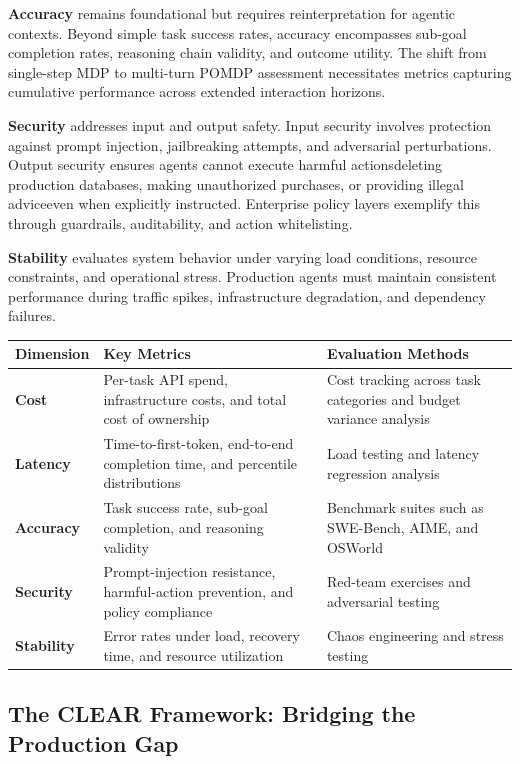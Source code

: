 \textbf{Accuracy} remains foundational but requires reinterpretation for agentic contexts. Beyond simple task success rates, accuracy encompasses sub-goal completion rates, reasoning chain validity, and outcome utility. The shift from single-step MDP to multi-turn POMDP assessment necessitates metrics capturing cumulative performance across extended interaction horizons.

\textbf{Security} addresses input and output safety. Input security involves protection against prompt injection, jailbreaking attempts, and adversarial perturbations. Output security ensures agents cannot execute harmful actionsdeleting production databases, making unauthorized purchases, or providing illegal adviceeven when explicitly instructed. Enterprise policy layers exemplify this through guardrails, auditability, and action whitelisting.

\textbf{Stability} evaluates system behavior under varying load conditions, resource constraints, and operational stress. Production agents must maintain consistent performance during traffic spikes, infrastructure degradation, and dependency failures.

\begin{table}[tbp]
\centering
\footnotesize
\begin{tabularx}{\textwidth}{YYY}
\toprule
\textbf{Dimension} & \textbf{Key Metrics} & \textbf{Evaluation Methods} \\
\midrule
\textbf{Cost} & Per-task API spend, infrastructure costs, and total cost of ownership & Cost tracking across task categories and budget variance analysis \\
\textbf{Latency} & Time-to-first-token, end-to-end completion time, and percentile distributions & Load testing and latency regression analysis \\
\textbf{Accuracy} & Task success rate, sub-goal completion, and reasoning validity & Benchmark suites such as SWE-Bench, AIME, and OSWorld \\
\textbf{Security} & Prompt-injection resistance, harmful-action prevention, and policy compliance & Red-team exercises and adversarial testing \\
\textbf{Stability} & Error rates under load, recovery time, and resource utilization & Chaos engineering and stress testing \\
\bottomrule
\end{tabularx}
\end{table}

\subsection{The CLEAR Framework: Bridging the Production Gap}

